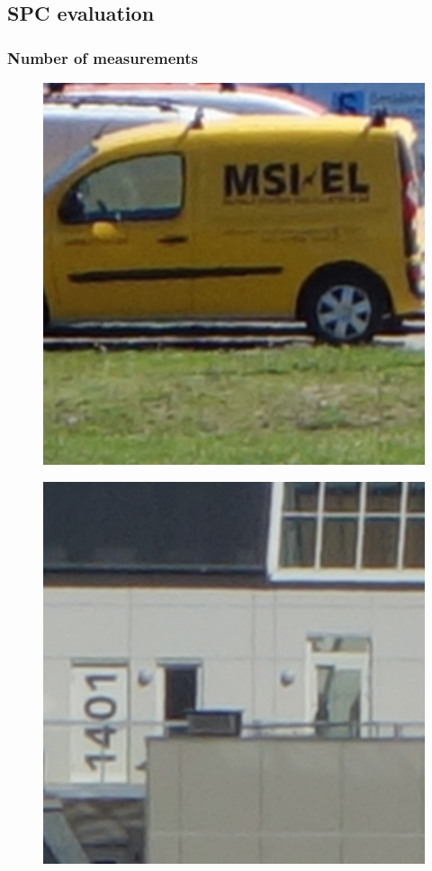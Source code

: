 \subsection{SPC evaluation}
\label{sec:eval_spc}

\subsubsection{Number of measurements}
\begin{figure}[H]
\begin{minipage}[t]{0.3\linewidth} %
	\includegraphics[width = 1\linewidth]{gfx/car/car_org.png}
	\label{fig:car_org}
\end{minipage}
\begin{minipage}[t]{0.3\linewidth} %
	\includegraphics[width = 1\linewidth]{gfx/hus/hus_org.png}

\end{minipage}
\end{figure}
